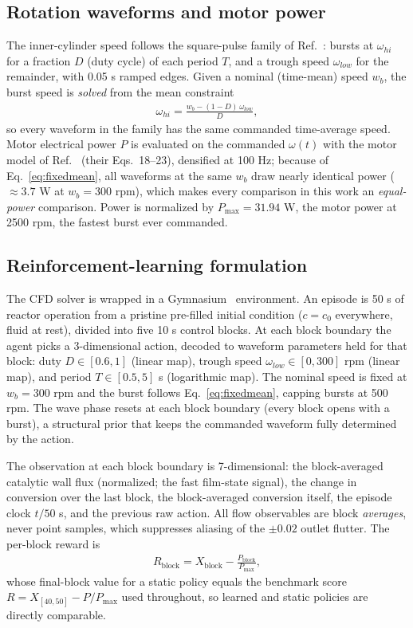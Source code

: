 \documentclass{article}
\begin{document}
\subsection{Rotation waveforms and motor power}
The inner-cylinder speed follows the square-pulse family of
Ref.~\cite{lopez2024process}: bursts at $\omega_{hi}$ for a fraction $D$ (duty
cycle) of each period $T$, and a trough speed $\omega_{low}$ for the remainder,
with 0.05 s ramped edges. Given a nominal (time-mean) speed $w_b$, the burst
speed is \emph{solved} from the mean constraint
\begin{align}
    \omega_{hi} = \frac{w_b - (1 - D)\,\omega_{low}}{D},
    \label{eq:fixedmean}
\end{align}
so every waveform in the family has the same commanded time-average speed.
Motor electrical power $P$ is evaluated on the commanded $\omega(t)$ with the
motor model of Ref.~\cite{lopez2024process} (their Eqs.~18--23), densified at
100 Hz; because of Eq.~\eqref{eq:fixedmean}, all waveforms at the same $w_b$
draw nearly identical power ($\approx 3.7$ W at $w_b = 300$ rpm), which makes
every comparison in this work an \emph{equal-power} comparison. Power is
normalized by $P_{\max} = 31.94$ W, the motor power at 2500 rpm, the fastest
burst ever commanded.

\subsection{Reinforcement-learning formulation}
The CFD solver is wrapped in a Gymnasium~\cite{towers2024gymnasium}
environment. An episode is 50 s of reactor operation from a pristine
pre-filled initial condition ($c = c_0$ everywhere, fluid at rest), divided
into five 10 s control blocks. At each block boundary the agent picks a
3-dimensional action, decoded to waveform parameters held for that block:
duty $D \in [0.6, 1]$ (linear map), trough speed
$\omega_{low} \in [0, 300]$ rpm (linear map), and period
$T \in [0.5, 5]$ s (logarithmic map). The nominal speed is fixed at
$w_b = 300$ rpm and the burst follows Eq.~\eqref{eq:fixedmean}, capping bursts
at 500 rpm. The wave phase resets at each block boundary (every block opens
with a burst), a structural prior that keeps the commanded waveform fully
determined by the action.

The observation at each block boundary is 7-dimensional: the block-averaged
catalytic wall flux (normalized; the fast film-state signal), the change in
conversion over the last block, the block-averaged conversion itself, the
episode clock $t/50$ s, and the previous raw action. All flow observables are
block \emph{averages}, never point samples, which suppresses aliasing of the
$\pm 0.02$ outlet flutter. The per-block reward is
\begin{align}
    R_\mathrm{block} = X_\mathrm{block} - \frac{P_\mathrm{block}}{P_{\max}},
\end{align}
whose final-block value for a static policy equals the benchmark score
$R = X_{[40,50]} - P/P_{\max}$ used throughout, so learned and static policies
are directly comparable.
\end{document}
